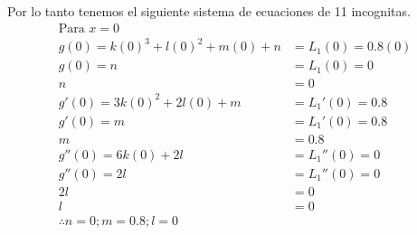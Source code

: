 Por lo tanto tenemos el siguiente sistema de ecuaciones de 11 incognitas.
\begin{align*}
	\text{Para }x=0                                      \\
	g(0)  = k(0)^3 + l(0)^2 + m(0) + n & = L_1(0)=0.8(0) \\
	g(0)  =  n                         & = L_1(0)=0      \\
	n                                  & = 0             \\
	g'(0) =3k(0)^2 + 2l(0) + m         & = L_1'(0)=0.8   \\
	g'(0) = m                          & = L_1'(0)=0.8   \\
	m                                  & = 0.8           \\
	g''(0)=6k(0)+2l                    & = L_1''(0)=0    \\
	g''(0)=2l                          & = L_1''(0)=0    \\
	2l                                 & = 0             \\
	l                                  & = 0             \\
	\therefore n=0; m=0.8; l=0                           \\
\end{align*}

